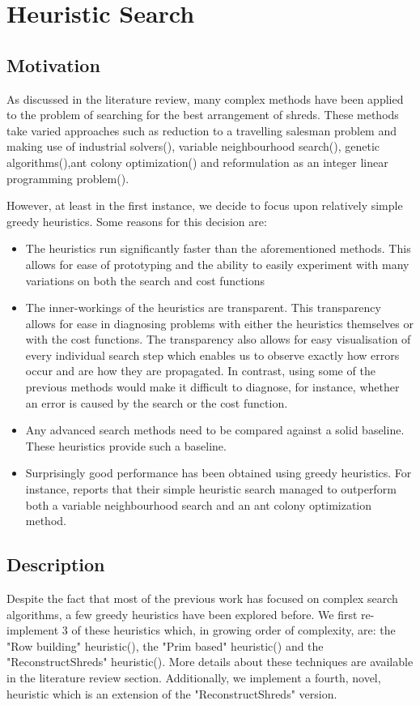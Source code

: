 \chapter{Heuristic Search}

\section{Motivation}
As discussed in the literature review, many complex methods have been applied to the problem of searching for the best arrangement of shreds. These methods take varied approaches such as reduction to a travelling salesman problem and making use of industrial solvers(\cite{P1}), variable neighbourhood search(\cite{P1,P5,P7}), genetic algorithms(\cite{P7}),ant colony optimization(\cite{P5}) and reformulation as an integer linear programming problem(\cite{P6}).

However, at least in the first instance, we decide to focus upon relatively simple greedy heuristics. Some reasons for this decision are:
\begin{itemize}
\item The heuristics run significantly faster than the aforementioned methods. This allows for ease of prototyping and the ability to easily experiment with many variations on both the search and cost functions
\item The inner-workings of the heuristics are transparent. This transparency allows for ease in diagnosing problems with either the heuristics themselves or with the cost functions. The transparency also allows for easy visualisation of every individual search step which enables us to observe exactly how errors occur and are how they are propagated. In contrast, using some of the previous methods would make it difficult to diagnose, for instance, whether an error is caused by the search or the cost function.
\item Any advanced search methods need to be compared against a solid baseline. These heuristics provide such a baseline.
\item Surprisingly good performance has been obtained using greedy heuristics. For instance, \cite{P2} reports that their simple heuristic search managed to outperform both a variable neighbourhood search and an ant colony optimization method.
\end{itemize}

\section{Description}
Despite the fact that most of the previous work has focused on complex search algorithms, a few greedy heuristics have been explored before. We first re-implement 3 of these heuristics which, in growing order of complexity, are: the "Row building" heuristic(\cite{P5}), the "Prim based" heuristic(\cite{P5}) and the "ReconstructShreds" heuristic(\cite{P2}). More details about these techniques are available in the literature review section.  Additionally, we implement a fourth, novel, heuristic which is an extension of the "ReconstructShreds" version. 

